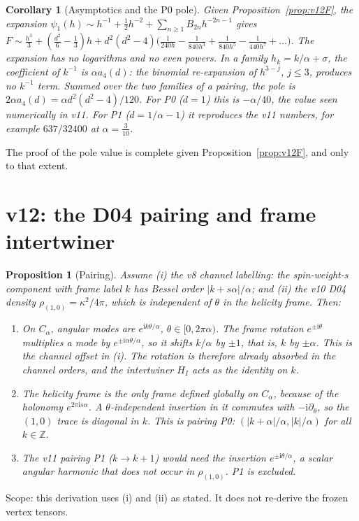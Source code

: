 \documentclass[11pt,a4paper]{article}
\newcommand{\ii}{\mathrm i}
\theoremstyle{plain}
\newtheorem{proposition}[theorem]{Proposition}
\newtheorem{corollary}[theorem]{Corollary}
\theoremstyle{definition}
\theoremstyle{remark}
\numberwithin{equation}{section}
\begin{document}
\begin{corollary}[Asymptotics and the P0 pole]
\label{cor:v12pole}
Given Proposition~\ref{prop:v12F}, the expansion
\(\psi_1(h)\sim h^{-1}+\tfrac12h^{-2}+\sum_{n\ge1}B_{2n}h^{-2n-1}\)
gives \(F\sim\tfrac{h^3}3+(\tfrac{d^2}6-\tfrac13)h+d^2(d^2-4)
\bigl(\tfrac1{240h}-\tfrac1{840h^3}+\tfrac1{840h^5}-\tfrac1{440h^7}+\dots\bigr)\).
The expansion has no logarithms and no even powers. In a family
\(h_k=k/\alpha+\sigma\), the coefficient of \(k^{-1}\) is
\(\alpha a_4(d)\): the binomial re-expansion of \(h^{3-j}\), \(j\le3\),
produces no \(k^{-1}\) term. Summed over the two families of a
pairing, the pole is \(2\alpha a_4(d)=\alpha d^2(d^2-4)/120\). For
P0 (\(d=1\)) this is \(-\alpha/40\), the value seen numerically in
v11. For P1 (\(d=1/\alpha-1\)) it reproduces the v11 numbers, for
example \(637/32400\) at \(\alpha=\tfrac3{10}\).
\end{corollary}
The proof of the pole value is complete given
Proposition~\ref{prop:v12F}, and only to that extent.

\section{v12: the D04 pairing and frame intertwiner}
\label{sec:v12pair}

\begin{proposition}[Pairing]
\label{prop:v12pair}
Assume (i) the v8 channel labelling: the spin-weight-\(s\) component
with frame label \(k\) has Bessel order \(|k+s\alpha|/\alpha\); and
(ii) the v10 D04 density \(\rho_{(1,0)}=\kappa^2/4\pi\), which is
independent of \(\theta\) in the helicity frame. Then:
\begin{enumerate}[label=(\alph*)]
\item On \(C_\alpha\), angular modes are \(e^{\ii k\theta/\alpha}\),
\(\theta\in[0,2\pi\alpha)\). The frame rotation \(e^{\pm\ii\theta}\)
multiplies a mode by \(e^{\pm\ii\alpha\theta/\alpha}\), so it shifts
\(k/\alpha\) by \(\pm1\), that is, \(k\) by \(\pm\alpha\). This is
the channel offset in (i). The rotation is therefore already
absorbed in the channel orders, and the intertwiner \(H_I\) acts as
the identity on \(k\).
\item The helicity frame is the only frame defined globally on
\(C_\alpha\), because of the holonomy \(e^{2\pi\ii s\alpha}\). A
\(\theta\)-independent insertion in it commutes with
\(-\ii\partial_\theta\), so the \((1,0)\) trace is diagonal in \(k\).
This is pairing P0:
\((|k+\alpha|/\alpha,|k|/\alpha)\) for all \(k\in\mathbb Z\).
\item The v11 pairing P1 (\(k\to k+1\)) would need the insertion
\(e^{\pm\ii\theta/\alpha}\), a scalar angular harmonic that does
not occur in \(\rho_{(1,0)}\). P1 is excluded.
\end{enumerate}
\end{proposition}
Scope: this derivation uses (i) and (ii) as stated. It does not
re-derive the frozen vertex tensors.
\end{document}
